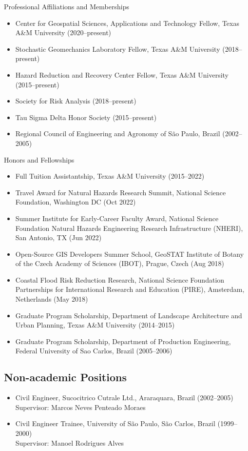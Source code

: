 \documentclass[11pt,oneside]{article}
\begin{document}
\vspace{1pt}

{Professional Affiliations and Memberships}
\begin{itemize}[leftmargin=20pt]
\item Center for Geospatial Sciences, Applications and Technology Fellow, Texas A\&M University (2020--present)
\item Stochastic Geomechanics Laboratory Fellow, Texas A\&M University (2018--present)
\item Hazard Reduction and Recovery Center Fellow, Texas A\&M University (2015--present)
\item Society for Risk Analysis (2018--present)
\item Tau Sigma Delta Honor Society (2015--present)
\item Regional Council of Engineering and Agronomy of São Paulo, Brazil (2002--2005)
\end{itemize}

\newpage

{Honors and Fellowships}
\begin{itemize}[leftmargin=20pt]
\item {Full Tuition Assistantship}, Texas A\&M University (2015--2022)
\item {Travel Award for Natural Hazards Research Summit}, National Science Foundation, Washington DC (Oct 2022)
\item {Summer Institute for Early-Career Faculty Award}, National Science Foundation Natural Hazards Engineering Research Infrastructure (NHERI), San Antonio, TX (Jun 2022)
\item {Open-Source GIS Developers Summer School}, GeoSTAT Institute of Botany of the Czech Academy of Sciences (IBOT), Prague, Czech (Aug 2018)
\item {Coastal Flood Risk Reduction Research}, National Science Foundation Partnerships for International Research and Education (PIRE), Amsterdam, Netherlands (May 2018)
\item {Graduate Program Scholarship}, Department of Landscape Architecture and Urban Planning, Texas A\&M University (2014--2015)
\item {Graduate Program Scholarship}, Department of Production Engineering, Federal University of Sao Carlos, Brazil (2005--2006)
\end{itemize}

\subsection*{Non-academic Positions}
\begin{itemize}[leftmargin=20pt]
\item Civil Engineer, Sucocitrico Cutrale Ltd., Araraquara, Brazil (2002--2005)\\
      Supervisor: Marcos Neves Penteado Moraes
\item Civil Engineer Trainee, University of São Paulo, São Carlos, Brazil (1999--2000)\\
      Supervisor: Manoel Rodrigues Alves
\end{itemize}
\end{document}

